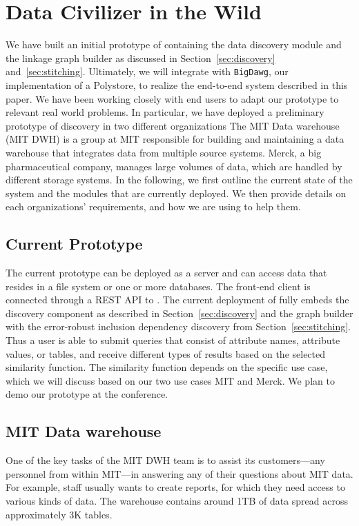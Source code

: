 \section{Data Civilizer in the Wild}
\label{sec:wild}

We have built an initial prototype of \dcv containing the data discovery module
and the linkage graph builder as discussed in Section~\ref{sec:discovery} and~\ref{sec:stitching}. Ultimately, we will integrate \dcv with
\texttt{BigDawg}, our implementation of a Polystore, to realize the end-to-end
system described in this paper.  We have been working closely with end users to
adapt our prototype to relevant real world problems.  In particular, we have deployed
a preliminary prototype of discovery in two different organizations The MIT Data
warehouse (MIT DWH) is a group at MIT responsible for building and maintaining a
data warehouse that integrates data from multiple source systems. Merck, a big
pharmaceutical company, manages large volumes of data, which are handled by
different storage systems.  In the following, we first outline the current state
of the system and the modules that are currently deployed.  We then provide
details on each organizations' requirements, and how we are using \dcv to help
them.

\subsection{Current \titledcv Prototype}
The current prototype can be deployed as a server and can access data that
resides in a file system or one or more databases.  The front-end client is
connected through a REST API to \dcv.  The current deployment of \dcv fully
embeds the discovery component as described in Section~\ref{sec:discovery} and
the graph builder with the error-robust inclusion dependency discovery from
Section~\ref{sec:stitching}.  Thus a user is able to submit queries that consist
of attribute names, attribute values, or tables, and receive different types of
results based on the selected similarity function. The similarity function
depends on the specific use case, which we will discuss based on our two use
cases MIT and Merck.  We plan to demo our \dcv prototype at the conference.

\subsection{MIT Data warehouse}

One of the key tasks of the MIT DWH team is to assist its customers—any
personnel from within MIT—in answering any of their questions about MIT data.
For example, staff usually wants to create reports, for which they need access
to various kinds of data. The warehouse contains around 1TB of data spread
across approximately 3K tables.

